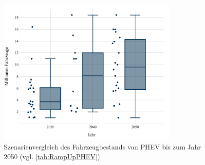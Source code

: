 \begin{figure}[H]
    \centering
    \includegraphics[width=0.8\textwidth]{Bilder/RampUp-PHEV-MA}
    \caption[Szenarienvergleich des Fahrzeugbestandes von PHEV bis zum Jahr \num{2050}]{Szenarienvergleich des Fahrzeugbestands von PHEV bis zum Jahr \num{2050} (vgl. \autoref{tab:RampUpPHEV})}\label{fig:RampUpPHEV}
\end{figure}